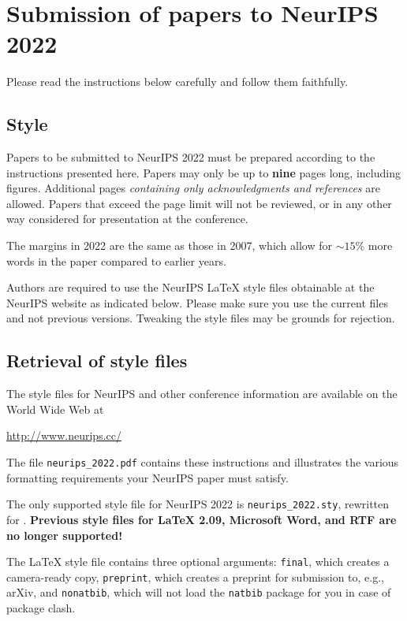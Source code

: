 \documentclass{article}
\begin{document}
\clearpage
\section{Submission of papers to NeurIPS 2022}


Please read the instructions below carefully and follow them faithfully.


\subsection{Style}


Papers to be submitted to NeurIPS 2022 must be prepared according to the
instructions presented here. Papers may only be up to {\bf nine} pages long,
including figures. Additional pages \emph{containing only acknowledgments and
references} are allowed. Papers that exceed the page limit will not be
reviewed, or in any other way considered for presentation at the conference.


The margins in 2022 are the same as those in 2007, which allow for $\sim$$15\%$
more words in the paper compared to earlier years.


Authors are required to use the NeurIPS \LaTeX{} style files obtainable at the
NeurIPS website as indicated below. Please make sure you use the current files
and not previous versions. Tweaking the style files may be grounds for
rejection.


\subsection{Retrieval of style files}


The style files for NeurIPS and other conference information are available on
the World Wide Web at
\begin{center}
  \url{http://www.neurips.cc/}
\end{center}
The file \verb+neurips_2022.pdf+ contains these instructions and illustrates the
various formatting requirements your NeurIPS paper must satisfy.


The only supported style file for NeurIPS 2022 is \verb+neurips_2022.sty+,
rewritten for \LaTeXe{}.  \textbf{Previous style files for \LaTeX{} 2.09,
  Microsoft Word, and RTF are no longer supported!}


The \LaTeX{} style file contains three optional arguments: \verb+final+, which
creates a camera-ready copy, \verb+preprint+, which creates a preprint for
submission to, e.g., arXiv, and \verb+nonatbib+, which will not load the
\verb+natbib+ package for you in case of package clash.
\end{document}
